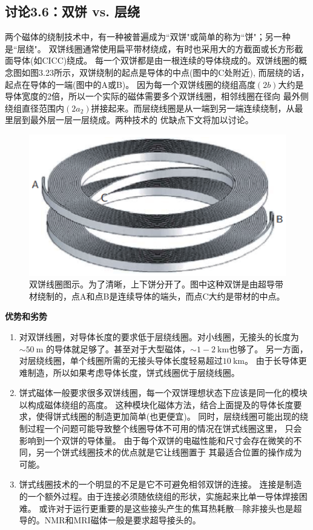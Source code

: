 \subsection{讨论3.6：双饼 vs. 层绕}
两个磁体的绕制技术中，有一种被普遍成为``双饼"或简单的称为``饼"；另一种是``层绕"。
双饼线圈通常使用扁平带材绕成，有时也采用大的方截面或长方形截面导体(如CICC)绕成。
每一个双饼都是由一根连续的导体绕成的。双饼线圈的概念图如图3.23所示，双饼绕制的起点是导体的中点(图中的C处附近),
而层绕的话，起点在导体的一端(图中的A或B)。
因为每一个双饼线圈的绕组高度$(2b)$大约是导体宽度的2倍，所以一个实际的磁体需要多个双饼线圈，相邻线圈在径向
最外侧绕组直径范围内$(2a_2)$拼接起来。而层绕线圈是从一端到另一端连续绕制，从最里层到最外层一层一层绕成。两种技术的
优缺点下文将加以讨论。

\begin{figure}[htbp]
	\centering
	\includegraphics[scale=0.7]{chpt3/figs/fig3.23.eps}
	\caption{双饼线圈图示。为了清晰，上下饼分开了。图中这种双饼是由超导带材绕制的，点A和点B是连续导体的端头，而点C大约是带材的中点。}
\end{figure}

\textbf{优势和劣势}
\begin{enumerate}
	\item 对双饼线圈，对导体长度的要求低于层绕线圈。对小线圈，无接头的长度为$\sim 50\ \mathrm{m}$
	的导体就足够了。甚至对于大型磁体，$\sim 1-2\ \mathrm{km}$也够了。
	另一方面，对层绕线圈，单个线圈所需的无接头导体长度轻易超过$10\ \mathrm{km}$。
	由于长导体更难制造，所以如果考虑导体长度，饼式线圈优于层绕线圈。

	\item 饼式磁体一般要求很多双饼线圈，每一个双饼理想状态下应该是同一化的模块以构成磁体绕组的高度。
	这种模块化磁体方法，结合上面提及的导体长度要求，使得饼式线圈的制造更加简单(也更便宜)。
	同时，层绕线圈可能出现的绕制过程一个问题可能导致整个线圈导体不可用的情况在饼式线圈这里，
	只会影响到一个双饼的导体量。
	由于每个双饼的电磁性能和尺寸会存在微笑的不同，另一个饼式线圈技术的优点就是它让线圈置于
	其最适合位置的操作成为可能。

	\item 饼式线圈技术的一个明显的不足是它不可避免相邻双饼的连接。
	连接是制造的一个额外过程。由于连接必须随依绕组的形状，实施起来比单一导体焊接困难。
	或许对于运行更重要的是这些接头产生的焦耳热耗散---除非接头也是超导的。NMR和MRI磁体一般是要求超导接头的。
\end{enumerate}



